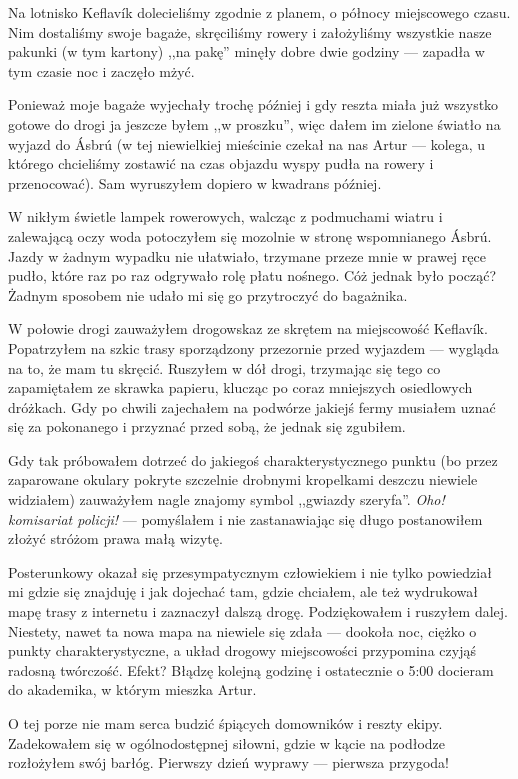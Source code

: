 Na lotnisko Keflavík dolecieliśmy zgodnie z planem, o północy miejscowego czasu. Nim dostaliśmy swoje bagaże, skręciliśmy rowery i założyliśmy wszystkie nasze pakunki (w tym kartony) ,,na pakę'' minęły dobre dwie godziny --- zapadła w tym czasie noc i zaczęło mżyć.

Ponieważ moje bagaże wyjechały trochę później i gdy reszta miała już wszystko gotowe do drogi ja jeszcze byłem ,,w proszku'', więc dałem im zielone światło na wyjazd do Ásbrú (w tej niewielkiej mieścinie czekał na nas Artur --- kolega, u którego chcieliśmy zostawić na czas objazdu wyspy pudła na rowery i przenocować). Sam wyruszyłem dopiero w kwadrans później.

W nikłym świetle lampek rowerowych, walcząc z podmuchami wiatru i zalewającą oczy woda potoczyłem się mozolnie w stronę wspomnianego Ásbrú. Jazdy w żadnym wypadku nie ułatwiało, trzymane przeze mnie w prawej ręce pudło, które raz po raz odgrywało rolę płatu nośnego. Cóż jednak było począć? Żadnym sposobem nie udało mi się go przytroczyć do bagażnika.

W połowie drogi zauważyłem drogowskaz ze skrętem na miejscowość Keflavík. Popatrzyłem na szkic trasy sporządzony przezornie przed wyjazdem --- wygląda na to, że mam tu skręcić. Ruszyłem w dół drogi, trzymając się tego co zapamiętałem ze skrawka papieru, klucząc po coraz mniejszych osiedlowych dróżkach. Gdy po chwili zajechałem na podwórze jakiejś fermy musiałem uznać się za pokonanego i przyznać przed sobą, że jednak się zgubiłem.

Gdy tak próbowałem dotrzeć do jakiegoś charakterystycznego punktu (bo przez zaparowane okulary pokryte szczelnie drobnymi kropelkami deszczu niewiele widziałem) zauważyłem nagle znajomy symbol ,,gwiazdy szeryfa''. \emph{Oho! komisariat policji!} --- pomyślałem i nie zastanawiając się długo postanowiłem złożyć stróżom prawa małą wizytę.

Posterunkowy okazał się przesympatycznym człowiekiem i nie tylko powiedział mi gdzie się znajduję i jak dojechać tam, gdzie chciałem, ale też wydrukował mapę trasy z internetu i zaznaczył dalszą drogę. Podziękowałem i ruszyłem dalej. Niestety, nawet ta nowa mapa na niewiele się zdała --- dookoła noc, ciężko o punkty charakterystyczne, a układ drogowy miejscowości przypomina czyjąś radosną twórczość. Efekt? Błądzę kolejną godzinę i ostatecznie o 5:00 docieram do akademika, w którym mieszka Artur.

O tej porze nie mam serca budzić śpiących domowników i reszty ekipy. Zadekowałem się w ogólnodostępnej siłowni, gdzie w kącie na podłodze rozłożyłem swój barłóg. Pierwszy dzień wyprawy --- pierwsza przygoda!